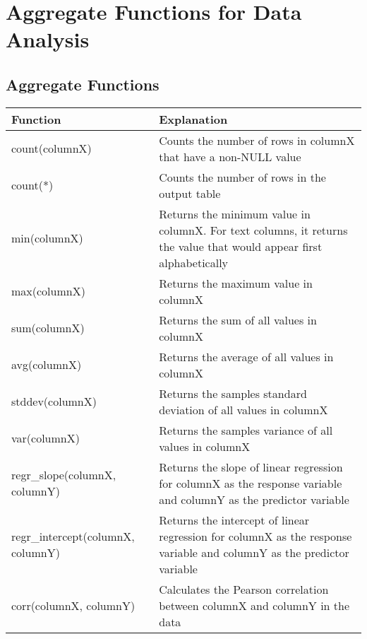 \chapter{Aggregate Functions for Data Analysis\label{Ch04}}
\section{Aggregate Functions}
\begin{table}
    \centering
    \begin{tabularx}{\textwidth}{lX}
        \hline
        Function                          & Explanation                                                                                                           \\
        \hline
        count(columnX)                    & Counts the number of rows in columnX that have a non-NULL value                                                       \\
        count(*)                          & Counts the number of rows in the output table                                                                         \\
        min(columnX)                      & Returns the minimum value in columnX. For text columns, it returns the value that would appear first alphabetically   \\
        max(columnX)                      & Returns the maximum value in columnX                                                                                  \\
        sum(columnX)                      & Returns the sum of all values in columnX                                                                              \\
        avg(columnX)                      & Returns the average of all values in columnX                                                                          \\
        stddev(columnX)                   & Returns the samples standard deviation of all values in columnX                                                       \\
        var(columnX)                      & Returns the samples variance of all values in columnX                                                                 \\
        regr\_slope(columnX, columnY)     & Returns the slope of linear regression for columnX as the response variable and columnY as the predictor variable     \\
        regr\_intercept(columnX, columnY) & Returns the intercept of linear regression for columnX as the response variable and columnY as the predictor variable \\
        corr(columnX, columnY)            & Calculates the Pearson correlation between columnX and columnY in the data                                            \\
        \hline
    \end{tabularx}
\end{table}

